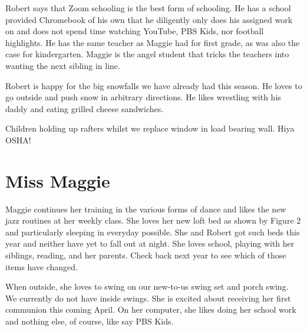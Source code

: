 \documentclass[letterpaper,11pt]{article}
\makeatletter
\newenvironment{figurehere}
  {\def\@captype{figure}}
  {}
\makeatother
\begin{document}
\begin{multicols}{2}
Robert says that Zoom schooling is the best form of schooling.  He has a school provided Chromebook
of his own that he diligently only does his assigned work on and does not spend
time watching YouTube, PBS Kids, nor football highlights. He has the same teacher as
Maggie had for first grade, as was also the case for kindergarten.  Maggie is the angel
student that tricks the teachers into wanting the next sibling in line.

Robert is happy for the big snowfalls we have already had this season.  He loves
to go outside and push snow in arbitrary directions. He likes wrestling with his
daddy and eating grilled cheese sandwiches.

\bigskip

\begin{figurehere}
    \centering   
    \caption{Children holding up rafters whilst we replace window in load 
    bearing wall. Hiya OSHA!}
   \end{figurehere}

\section{Miss Maggie}

Maggie continues her training in the various forms of dance and likes the new
jazz routines at her weekly class.  She loves her new loft bed as shown by
Figure 2 and particularly sleeping in everyday possible.  She and Robert got 
such beds this year and neither have yet to fall out at night.  She loves school,
playing with her siblings, reading, and her parents.  Check back next year to see which 
of those items have changed.

When outside, she loves to swing on our new-to-us swing set and porch swing. We
currently do not have inside swings.  She is excited about receiving her
first communion this coming April.  On her computer, she likes doing her school
work and nothing else, of course, like say PBS Kids.


\end{multicols}
\end{document}

